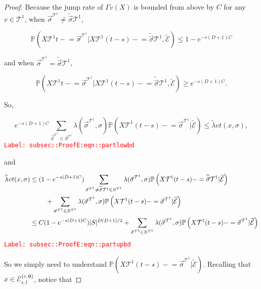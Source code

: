 \documentclass[12pt]{article}
\newcommand{\mb}{\mathbb}
\newcommand{\mc}{\mathcal}
\newcommand{\tr}{\textcolor{red}}
\newcommand{\labe}[1]{\tr{\texttt{Label: #1}}}
\newcommand{\pr}{\mb{P}}							%
\renewcommand{\root}{\mathbf{0}}				%
\renewcommand{\v}{v}							%
\renewcommand{\S}{S}							%
\newcommand{\s}{\sigma}							%
\newcommand{\sv}{\vec{\s}}						%
\newcommand{\x}{x}								%
\renewcommand{\t}{t}							%
\renewcommand{\tt}{s}							%
\newcommand{\X}{X}								%
\newcommand{\carp}[1]{^{#1}}					%
\newcommand{\vsi}[1]{^{#1}}						%
\newcommand{\cind}[1]{_{#1}}					%
\newcommand{\const}{C}							%
\newcommand{\degr}{D}							%
\newcommand{\tree}{\mc{T}}						%
\newcommand{\sln}[1]{^{#1}}						%
\newcommand{\rate}{\lambda}						%
\newcommand{\alt}[1]{\widetilde{#1}}			%
\newcommand{\evnt}{\mc{E}}						%
\newcommand{\pmap}{\Gamma}						%
\newcommand{\crate}{\alt{\lambda}}				%
\begin{document}
\begin{proof}
Because the jump rate of \(\pmap{\v}(\X{}{})\) is bounded from above by \(\const{}\) for any \(\v\in\tree\sln{1}\),  when \(\sv\cind{}\vsi{\tree\sln{1}}\neq\alt{\sv}{}{\tree\sln{1}}\), 

\[\pr\left(\X{\tree\sln{1}}{\t-} = \sv\cind{}\vsi{\tree\sln{1}}|\X{\tree\sln{1}}{(\t-\tt)-}=\alt{\sv}{}{\tree\sln{1}},\alt{\evnt}{	}\right) \leq 1-e^{-\tt(\degr+1)\const{}}\]

and when \(\sv\cind{}\vsi{\tree\sln{1}}=\alt{\sv}{}{\tree\sln{1}}\),

\[\pr\left(\X{\tree\sln{1}}{\t-} = \sv\cind{}\vsi{\tree\sln{1}}|\X{\tree\sln{1}}{(\t-\tt)-}=\alt{\sv}{}{\tree\sln{1}},\alt{\evnt}{	}\right) \geq e^{-\tt(\degr+1)\const{}}.\]

So,

\begin{equation}
e^{-\tt(\degr+1)\const{}}\sum_{\sv\cind{}\vsi{\tree\sln{1}}\in \S\carp{\tree\sln{1}}} \rate{}(\sv\cind{}\vsi{\tree\sln{1}},\s)\pr\left(\X{\tree\sln{1}}{(\t-\tt)-}=\sv\cind{}\vsi{\tree\sln{1}}|\alt{\evnt}{	}\right) \leq \crate{\v}{\t}(\x{}{},\s),
\label{subsec::ProofE:eqn::partlowbd}
\end{equation}
\labe{subsec::ProofE:eqn::partlowbd}

and

\begin{align}
\crate{\v}{\t}(\x{}{},\s)&\leq (1 - e^{-\tt(\degr+1)\const{}})\sum_{\sv\cind{}\vsi{\tree\sln{1}}\neq \alt{\sv}{}{\tree\sln{1}} \in \S\carp{\tree\sln{1}}} \rate{}(\sv\cind{}\vsi{\tree\sln{1}},\s)\pr\left(\X{\tree\sln{1}}{(\t-\tt)-}=\alt{\sv}{}{\tree\sln{1}}|\alt{\evnt}{	}\right)\nonumber\\
&\hspace{24 pt} +\sum_{\sv\cind{}\vsi{\tree\sln{1}} \in \S\carp{\tree\sln{1}}} \rate{}(\sv\cind{}\vsi{\tree\sln{1}},\s)\pr\left(\X{\tree\sln{1}}{(\t-\tt)-}=\sv\cind{}\vsi{\tree\sln{1}}|\alt{\evnt}{	}\right)\nonumber\\
&\leq \const{}(1 - e^{-\tt(\degr+1)\const{}})|\S|^{\degr(\degr+1)/2} + \sum_{\sv\cind{}\vsi{\tree\sln{1}} \in \S\carp{\tree\sln{1}}} \rate{}(\sv\cind{}\vsi{\tree\sln{1}},\s)\pr\left(\X{\tree\sln{1}}{(\t-\tt)-}=\sv\cind{}\vsi{\tree\sln{1}}|\alt{\evnt}{	}\right)
\label{subsec::ProofE:eqn::partupbd}
\end{align}
\labe{subsec::ProofE:eqn::partupbd}

So we simply need to understand \(\pr\left(\X{\tree\sln{1}}{(\t-\tt)-}=\sv\cind{}\vsi{\tree\sln{1}}|\alt{\evnt}{	}\right)\). Recalling that \(\x{}{} \in \evnt{}^{\{\v,\root\}}_{\tt,\t}\), notice that


\end{proof}
\end{document}

